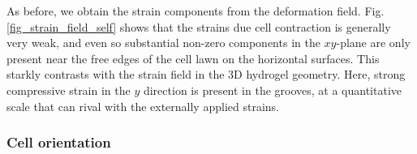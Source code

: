 \documentclass[11pt]{amsart}
\begin{document}
\begin{figure}
\end{figure}

As before, we obtain the strain components from the deformation field. Fig. \ref{fig_strain_field_self} shows that the strains due cell contraction is generally very weak, and even so substantial non-zero components in the $xy$-plane are only present near the free edges of the cell lawn on the horizontal surfaces. This starkly contrasts with the strain field in the 3D hydrogel geometry. Here, strong compressive strain in the $y$ direction is present in the grooves, at a quantitative scale that can rival with the externally applied strains.


\subsubsection{Cell orientation}
\end{document}
